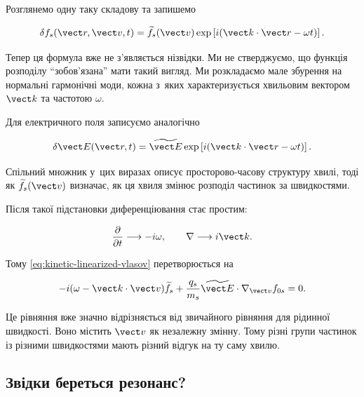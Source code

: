 Розглянемо одну таку складову та запишемо

\begin{equation}\label{eq:kinetic-wave-harmonic}
\delta f_s(\vect r,\vect v,t)
=\widetilde f_s(\vect v)
\exp\left[i(\vect k\cdot\vect r-\omega t)\right].
\end{equation}

Тепер ця формула вже не з'являється нізвідки. Ми не стверджуємо, що функція розподілу
\enquote{зобов'язана} мати такий вигляд. Ми розкладаємо мале збурення на нормальні
гармонічні моди, кожна з~яких характеризується хвильовим вектором $\vect k$ та частотою
$\omega$.

Для електричного поля записуємо аналогічно

\begin{equation*}
\delta\vect E(\vect r,t)
=
\widetilde{\vect E}
\exp\left[i(\vect k\cdot\vect r-\omega t)\right].
\end{equation*}

Спільний множник у~цих виразах описує просторово-часову структуру хвилі, тоді як
$\widetilde f_s(\vect v)$ визначає, як ця хвиля змінює розподіл частинок за швидкостями.

Після такої підстановки диференціювання стає простим:

\begin{equation*}
\frac{\partial}{\partial t}
\longrightarrow
-i\omega,
\qquad
\nabla
\longrightarrow
i\vect k.
\end{equation*}

Тому \eqref{eq:kinetic-linearized-vlasov} перетворюється на

\begin{equation}\label{eq:kinetic-wave-response}
-i(\omega-\vect k\cdot\vect v)\widetilde f_s
+
\frac{q_s}{m_s}
\widetilde{\vect E}\cdot
\nabla_{\vect v}f_{0s}
=0.
\end{equation}

Це рівняння вже значно відрізняється від звичайного рівняння для рідинної швидкості.
Воно містить $\vect v$ як незалежну змінну. Тому різні групи частинок із різними
швидкостями мають різний відгук на ту саму хвилю.

\subsection*{Звідки береться резонанс?}

